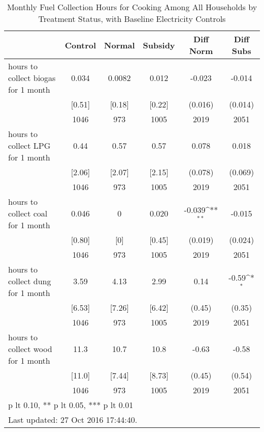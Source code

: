 \begin{table}[htbp]\centering
\def\sym#1{\ifmmode^{#1}\else\(^{#1}\)\fi}
\caption{Monthly Fuel Collection Hours for Cooking Among All Households by Treatment Status, with Baseline Electricity Controls \label{tab:"balance"}}
\begin{tabular*}{0.9\hsize}{@{\hskip\tabcolsep\extracolsep\fill}l*{1}{ccccc}}
\toprule
                                &  Control&   Normal&  Subsidy&Diff Norm         &Diff Subs         \\
\midrule
hours to collect biogas for 1 month&    0.034&   0.0082&    0.012&   -0.023         &   -0.014         \\
                                &   [0.51]&   [0.18]&   [0.22]&  (0.016)         &  (0.014)         \\
                                &     1046&      973&     1005&     2019         &     2051         \\
hours to collect LPG for 1 month&     0.44&     0.57&     0.57&    0.078         &    0.018         \\
                                &   [2.06]&   [2.07]&   [2.15]&  (0.078)         &  (0.069)         \\
                                &     1046&      973&     1005&     2019         &     2051         \\
hours to collect coal for 1 month&    0.046&        0&    0.020&   -0.039\sym{**} &   -0.015         \\
                                &   [0.80]&      [0]&   [0.45]&  (0.019)         &  (0.024)         \\
                                &     1046&      973&     1005&     2019         &     2051         \\
hours to collect dung for 1 month&     3.59&     4.13&     2.99&     0.14         &    -0.59\sym{*}  \\
                                &   [6.53]&   [7.26]&   [6.42]&   (0.45)         &   (0.35)         \\
                                &     1046&      973&     1005&     2019         &     2051         \\
hours to collect wood for 1 month&     11.3&     10.7&     10.8&    -0.63         &    -0.58         \\
                                &   [11.0]&   [7.44]&   [8.73]&   (0.45)         &   (0.54)         \\
                                &     1046&      973&     1005&     2019         &     2051         \\
\bottomrule
\multicolumn{6}{l}{\footnotesize * p lt 0.10, ** p lt 0.05, *** p lt 0.01}\\
\multicolumn{6}{l}{\footnotesize Last updated: 27 Oct 2016 17:44:40.}\\
\end{tabular*}
\end{table}
